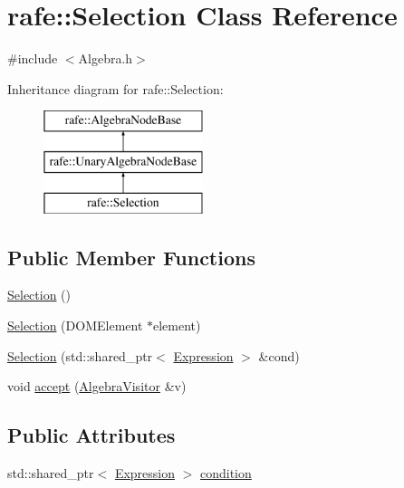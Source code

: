 \hypertarget{classrafe_1_1_selection}{\section{rafe\+:\+:Selection Class Reference}
\label{classrafe_1_1_selection}
}


{\ttfamily \#include $<$Algebra.\+h$>$}

Inheritance diagram for rafe\+:\+:Selection\+:\begin{figure}[H]
\begin{center}
\leavevmode
\includegraphics[height=3.000000cm]{classrafe_1_1_selection}
\end{center}
\end{figure}
\subsection*{Public Member Functions}
\begin{DoxyCompactItemize}
\item 
\hyperlink{classrafe_1_1_selection_a272335b08a2f8a590e922e41ea7cc151}{Selection} ()
\item 
\hyperlink{classrafe_1_1_selection_aa69f2e5072b24749451f34d0444844ce}{Selection} (D\+O\+M\+Element $\ast$element)
\item 
\hyperlink{classrafe_1_1_selection_a6fb6f1e1d896a7465584c798d126c3d9}{Selection} (std\+::shared\+\_\+ptr$<$ \hyperlink{classrafe_1_1_expression}{Expression} $>$ \&cond)
\item 
void \hyperlink{classrafe_1_1_selection_a7304eb319db31a5c8ecb56b33d58e1e3}{accept} (\hyperlink{classrafe_1_1_algebra_visitor}{Algebra\+Visitor} \&v)
\end{DoxyCompactItemize}
\subsection*{Public Attributes}
\begin{DoxyCompactItemize}
\item 
std\+::shared\+\_\+ptr$<$ \hyperlink{classrafe_1_1_expression}{Expression} $>$ \hyperlink{classrafe_1_1_selection_ade262c53a6fdf72acd271ebb36ca394d}{condition}
\end{DoxyCompactItemize}


